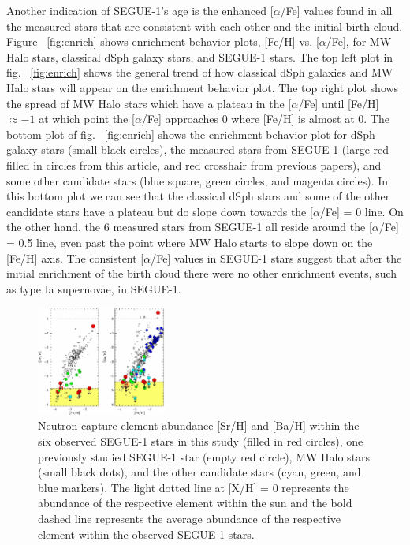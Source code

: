 \documentclass{aastex631}
\begin{document}
Another indication of SEGUE-1's age is the enhanced [$\alpha$/Fe] values found in all the measured stars that are consistent with 
each other and the initial birth cloud. Figure ~\ref{fig:enrich} shows enrichment behavior plots, [Fe/H] vs. [$\alpha$/Fe],
for MW Halo stars, classical dSph galaxy stars, and SEGUE-1 stars. The top left plot in fig. ~\ref{fig:enrich} shows the general 
trend of how classical dSph galaxies and MW Halo stars will appear on the enrichment behavior plot.
The top right plot shows the spread of MW Halo stars which have a plateau in the [$\alpha$/Fe] until [Fe/H] $\approx -1$ at which point
the [$\alpha$/Fe] approaches 0 where [Fe/H] is almost at 0. The bottom plot of fig. ~\ref{fig:enrich} shows the enrichment behavior plot for dSph galaxy
stars (small black circles), the measured stars from SEGUE-1 (large red filled in circles from this article, and red crosshair from
previous papers), and some other candidate stars (blue square, green circles, and magenta circles). In this bottom plot we can see that
the classical dSph stars and some of the other candidate stars have a plateau but do slope down towards the [$\alpha$/Fe] = 0 line.
On the other hand, the 6 measured stars from SEGUE-1 all reside around the [$\alpha$/Fe] = 0.5 line, even past the point where MW
Halo starts to slope down on the [Fe/H] axis. The consistent [$\alpha$/Fe] values in SEGUE-1 stars suggest that after the initial
enrichment of the birth cloud there were no other enrichment events, such as type Ia supernovae, in SEGUE-1.

\begin{figure}
    \begin{center}
        \includegraphics[width=0.38\textwidth]{neutron_cap.jpg}
    \end{center}
    \caption{Neutron-capture element abundance [Sr/H] and [Ba/H] within the six observed SEGUE-1 stars in this study 
    (filled in red circles), one previously studied SEGUE-1 star (empty red circle), MW Halo stars (small black dots),
    and the other candidate stars (cyan, green, and blue markers). The light dotted line at [X/H] = 0 represents the abundance
    of the respective element within the sun and the bold dashed line represents the average abundance of the respective element
    within the observed SEGUE-1 stars.}
    \label{fig:neutron_cap}
\end{figure}
\end{document}
